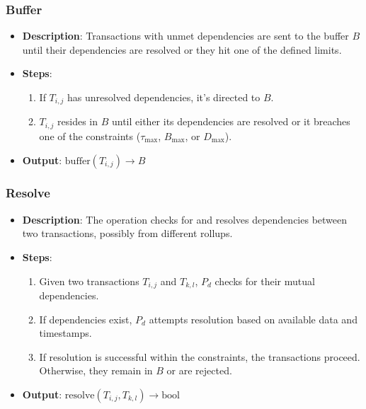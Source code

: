 \documentclass{article}
\begin{document}
\subsubsection{Buffer}
\begin{itemize}
    \item \textbf{Description}: Transactions with unmet dependencies are sent to the buffer \( B \) until their dependencies are resolved or they hit one of the defined limits.
    \item \textbf{Steps}:
    \begin{enumerate}
        \item If \( T_{i,j} \) has unresolved dependencies, it’s directed to \( B \).
        \item \( T_{i,j} \) resides in \( B \) until either its dependencies are resolved or it breaches one of the constraints (\( \tau_{\text{max}} \), \( B_{\text{max}} \), or \( D_{\text{max}} \)).
    \end{enumerate}
    \item \textbf{Output}: \( \text{buffer}(T_{i,j}) \rightarrow B \)
\end{itemize}

\subsubsection{Resolve}
\begin{itemize}
    \item \textbf{Description}: The operation checks for and resolves dependencies between two transactions, possibly from different rollups.
    \item \textbf{Steps}:
    \begin{enumerate}
        \item Given two transactions \( T_{i,j} \) and \( T_{k,l} \), \( P_d \) checks for their mutual dependencies.
        \item If dependencies exist, \( P_d \) attempts resolution based on available data and timestamps.
        \item If resolution is successful within the constraints, the transactions proceed. Otherwise, they remain in \( B \) or are rejected.
    \end{enumerate}
    \item \textbf{Output}: \( \text{resolve}(T_{i,j}, T_{k,l}) \rightarrow \text{bool} \)
\end{itemize}
\end{document}
